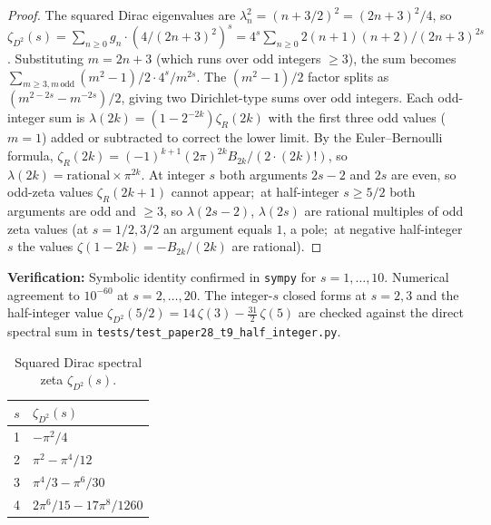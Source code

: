 \documentclass[11pt]{article}
\begin{document}
\begin{proof}
The squared Dirac eigenvalues are $\lambda_n^2 = (n + 3/2)^2
= (2n+3)^2/4$, so
$\zeta_{D^2}(s) = \sum_{n \ge 0} g_n \cdot (4/(2n+3)^2)^s
= 4^s \sum_{n \ge 0} 2(n+1)(n+2) / (2n+3)^{2s}$.
Substituting $m = 2n+3$ (which runs over odd integers $\ge 3$), the
sum becomes $\sum_{m \ge 3, m\,\mathrm{odd}} (m^2-1)/2 \cdot
4^s / m^{2s}$.  The $(m^2 - 1)/2$ factor splits as
$(m^{2-2s} - m^{-2s})/2$, giving two Dirichlet-type sums over odd
integers.  Each odd-integer sum is $\lambda(2k) = (1-2^{-2k})\zeta_R(2k)$
with the first three odd values ($m=1$) added or subtracted to correct
the lower limit.  By the Euler--Bernoulli formula,
$\zeta_R(2k) = (-1)^{k+1} (2\pi)^{2k} B_{2k} / (2\cdot (2k)!)$,
so $\lambda(2k) = \mathrm{rational} \times \pi^{2k}$.  At integer $s$
both arguments $2s-2$ and $2s$ are even, so odd-zeta values
$\zeta_R(2k+1)$ cannot appear;\ at half-integer $s \ge 5/2$ both
arguments are odd and $\ge 3$, so $\lambda(2s-2)$, $\lambda(2s)$ are
rational multiples of odd zeta values (at $s = 1/2, 3/2$ an argument
equals $1$, a pole;\ at negative half-integer $s$ the values
$\zeta(1-2k) = -B_{2k}/(2k)$ are rational).
\end{proof}

\noindent\textbf{Verification:} Symbolic identity confirmed in
\texttt{sympy} for $s = 1, \ldots, 10$.  Numerical agreement to
$10^{-60}$ at $s = 2, \ldots, 20$.  The integer-$s$ closed forms at
$s = 2, 3$ and the half-integer value
$\zeta_{D^2}(5/2) = 14\,\zeta(3) - \tfrac{31}{2}\,\zeta(5)$ are checked
against the direct spectral sum in
\texttt{tests/test\_paper28\_t9\_half\_integer.py}.

\begin{table}[h]
\centering
\caption{Squared Dirac spectral zeta $\zeta_{D^2}(s)$.}
\label{tab:D2_values}
\begin{tabular}{@{}cl@{}}
\toprule
$s$ & $\zeta_{D^2}(s)$ \\
\midrule
1 & $-\pi^2/4$ \\
2 & $\pi^2 - \pi^4/12$ \\
3 & $\pi^4/3 - \pi^6/30$ \\
4 & $2\pi^6/15 - 17\pi^8/1260$ \\
\bottomrule
\end{tabular}
\end{table}
\end{document}
